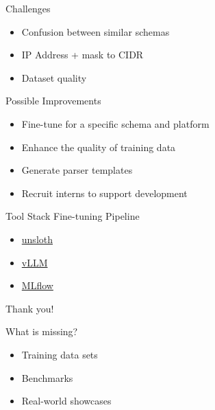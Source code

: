 \documentclass[aspectratio=169]{beamer}
\begin{document}
\begin{frame}{Challenges}

  \begin{itemize}
    \setlength\itemsep{1em}
    \item Confusion between similar schemas
    \item IP Address + mask to CIDR
    \item Dataset quality
  \end{itemize}

\end{frame}


\begin{frame}{Possible Improvements}

  \begin{itemize}
    \setlength\itemsep{1em}
    \item Fine-tune for a specific schema and platform
    \item Enhance the quality of training data
    \item Generate parser templates
    \item Recruit interns to support development
  \end{itemize}

\end{frame}


\begin{frame}{Tool Stack Fine-tuning Pipeline}

  \begin{itemize}
    \setlength\itemsep{1em}
    \item \href{https://github.com/unslothai/unsloth}{unsloth}
    \item \href{https://github.com/vllm-project/vllm}{vLLM}
    \item \href{https://github.com/mlflow/mlflow}{MLflow}
  \end{itemize}

\end{frame}


{
  \begin{frame}[plain,c]
    \begin{center}
      \Huge \color[rgb]{1,1,1}Thank you!
    \end{center}
  \end{frame}
}

\begin{frame}{What is missing?}

  \begin{itemize}
    \setlength\itemsep{1em}
    \item Training data sets
    \item Benchmarks
    \item Real-world showcases
  \end{itemize}

\end{frame}
\end{document}
